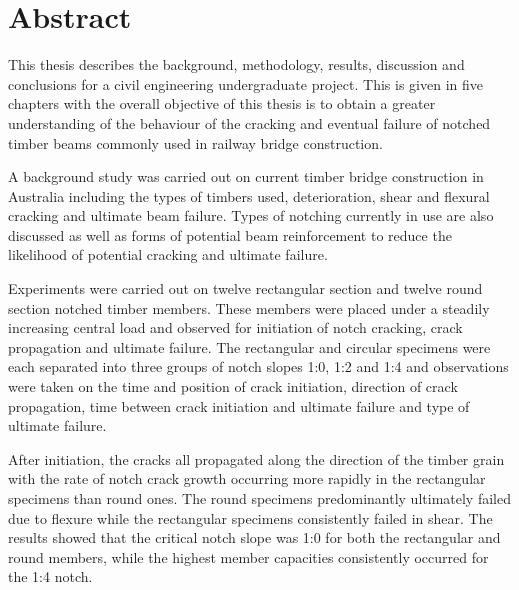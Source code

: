 \documentclass[11pt,a4paper]{article}
\numberwithin{equation}{subsection}
\begin{document}
\section*{Abstract}
This thesis describes the background, methodology, results, discussion and conclusions for a civil engineering undergraduate project. This is given in five chapters with the overall objective of this thesis is to obtain a greater understanding of the behaviour of the cracking and eventual failure of notched timber beams commonly used in railway bridge construction.

\vspace*{\baselineskip}

\noindent
A background study was carried out on current timber bridge construction in Australia including the types of timbers used, deterioration, shear and flexural cracking and ultimate beam failure. Types of notching currently in use are also discussed as well as forms of potential beam reinforcement to reduce the likelihood of potential cracking and ultimate failure.

\vspace*{\baselineskip}

\noindent
Experiments were carried out on twelve rectangular section and twelve round section notched timber members.  These members were placed under a steadily increasing central load and observed for initiation of notch cracking, crack propagation and ultimate failure. The rectangular and circular specimens were each separated into three groups of notch slopes 1:0, 1:2 and 1:4 and observations were taken on the time and position of crack initiation, direction of crack propagation, time between crack initiation and ultimate failure and type of ultimate failure.

\vspace*{\baselineskip}

\noindent
After initiation, the cracks all propagated along the direction of the timber grain with the rate of notch crack growth occurring more rapidly in the rectangular specimens than round ones. The round specimens predominantly ultimately failed due to flexure while the rectangular specimens consistently failed in shear. The results showed that the critical notch slope was 1:0 for both the rectangular and round members, while the highest member capacities consistently occurred for the 1:4 notch.

\vspace*{\baselineskip}
\end{document}
